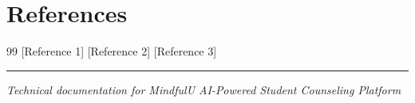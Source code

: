 \documentclass[11pt,a4paper]{article}
\begin{document}
\section{References}
\begin{thebibliography}{99}
 [Reference 1]
 [Reference 2]
 [Reference 3]
\end{thebibliography}

\vspace{1cm}
\hrule
\vspace{0.3cm}
\begin{center}
\textit{Technical documentation for MindfulU AI-Powered Student Counseling Platform}
\end{center}
\end{document}
